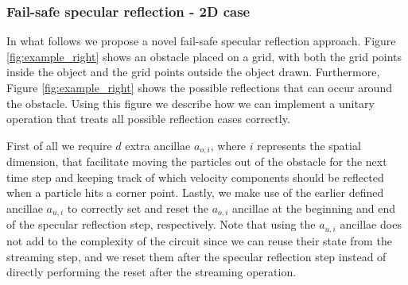
\subsubsection{Fail-safe specular reflection - 2D case}\label{ssec:Correct Reflection}
In what follows we propose a novel fail-safe specular reflection approach. 
Figure \ref{fig:example_right} shows an obstacle placed on a grid, with both the grid points inside the object and the grid points outside the object drawn. Furthermore, Figure \ref{fig:example_right} shows the possible reflections that can occur around the obstacle. Using this figure we describe how we can implement a unitary operation that treats all possible reflection cases correctly. 

First of all we require $d$ extra ancillae $a_{o,i}$, where $i$ represents the spatial dimension, that facilitate moving the particles out of the obstacle for the next time step and keeping track of which velocity components should be reflected when a particle hits a corner point. Lastly, we make use of the earlier defined ancillae $a_{u,i}$ to correctly set and reset the $a_{o,i}$ ancillae at the beginning and end of the specular reflection step, respectively. Note that using the $a_{u,i}$ ancillae does not add to the complexity of the circuit since we can reuse their state from the streaming step, and we reset them after the specular reflection step instead of directly performing the reset after the streaming operation.

